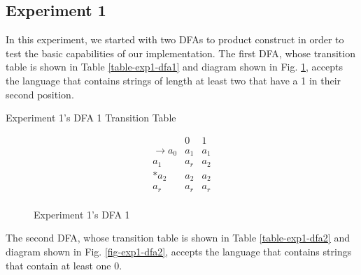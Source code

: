 \documentclass[conference]{IEEEtran}
\begin{document}
\subsection{Experiment 1}
In this experiment, we started with two DFAs to product construct in order to test the basic capabilities of our implementation. The first DFA, whose transition table is shown in Table \ref{table-exp1-dfa1} and diagram shown in Fig. \ref{fig-exp1-dfa1}, accepts the language that contains strings of length at least two that have a 1 in their second position.

\begin{table}[h!]
    \caption{Experiment 1's DFA 1 Transition Table}
    \begin{displaymath}
        \begin{array}{r|c|c|}
        & 0 & 1 \\
        \hline
        \rightarrow a_0 & a_1 & a_1 \\
        a_1 & a_r & a_2 \\
        * a_2 & a_2 & a_2 \\
        a_r & a_r & a_r \\
        \end{array}
    \end{displaymath}
    \label{table-exp1-dfa1}
\end{table}
\begin{figure}[h!]
    \centering
    \caption{Experiment 1's DFA 1}
    \label{fig-exp1-dfa1}
\end{figure}

The second DFA, whose transition table is shown in Table \ref{table-exp1-dfa2} and diagram shown in Fig. \ref{fig-exp1-dfa2}, accepts the language that contains strings that contain at least one 0.
\end{document}
